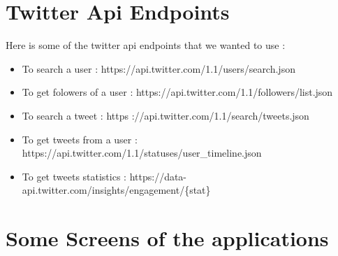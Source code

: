 \documentclass{article}
\begin{document}
\section{Twitter Api Endpoints}
Here is some of the twitter api endpoints that we wanted to use :
\begin{itemize}
    \item To search a user : https://api.twitter.com/1.1/users/search.json
    \item To get folowers of a user : https://api.twitter.com/1.1/followers/list.json
    \item To search a tweet : https ://api.twitter.com/1.1/search/tweets.json
    \item To get tweets from a user : https://api.twitter.com/1.1/statuses/user\_timeline.json 
    \item To get tweets statistics : https://data-api.twitter.com/insights/engagement/\{stat\} 
\end{itemize}


\section{Some Screens of the applications}
\end{document}
